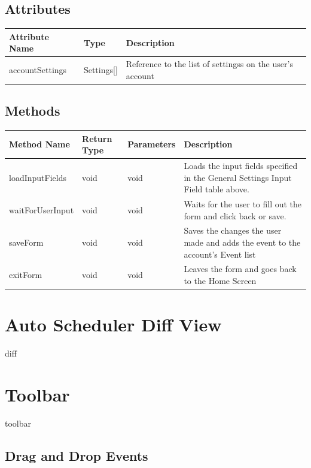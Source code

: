 \documentclass{scrreprt}
\begin{document}
\subsection{Attributes}

\begin{center}
\begin{longtable}{ | p{3cm} | p{3cm} | p{9cm} | }
\hline
\textbf{Attribute Name} & \textbf{Type} & \textbf{Description} \\
\hline
accountSettings & Settings[] & Reference to the list of settingss on the user's account \\
\hline
\end{longtable}
\end{center}

\subsection{Methods}

\begin{center}
\begin{longtable}{ | p{3cm} | p{1cm} | p{2cm} | p{9cm} | }
\hline
\textbf{Method Name} & \textbf{Return Type} & \textbf{Parameters} & \textbf{Description} \\
\hline
loadInputFields & void & void & Loads the input fields specified in the General Settings Input Field table above.\\
\hline
waitForUserInput & void & void & Waits for the user to fill out the form and click back or save. \\
\hline
saveForm & void & void & Saves the changes the user made and adds the event to the account's Event list \\
\hline
exitForm & void & void & Leaves the form and goes back to the Home Screen \\
\hline
\end{longtable}
\end{center}

\section{Auto Scheduler Diff View}

diff

\section{Toolbar}

toolbar

\subsection{Drag and Drop Events}
\end{document}
